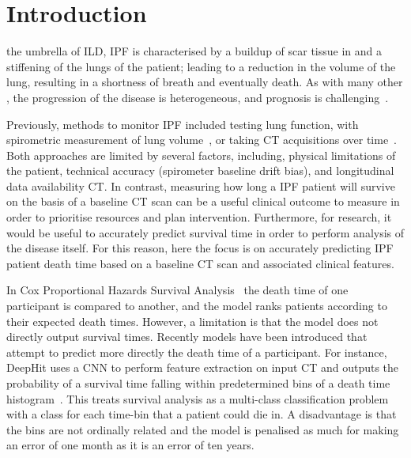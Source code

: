 
\section{Introduction} \label{sec:introduction}
     the umbrella of \gls{ILD}, \gls{IPF} is  characterised by a buildup of scar tissue in and a stiffening of the lungs of the patient; leading to a reduction in the volume of the lung, resulting in a shortness of breath and eventually death. As with many other , the progression of the disease is heterogeneous, and prognosis is challenging~\cite{King2011IdiopathicFibrosis}.
    
    Previously, methods to monitor \gls{IPF} included testing lung function, with spirometric measurement of lung volume~\cite{Watters1986AFibrosis}, or taking \gls{CT} acquisitions over time~\cite{Lynch2018DiagnosticPaper}. Both approaches are limited by several factors, including, physical limitations of the patient, technical accuracy (spirometer baseline drift bias), and  longitudinal data availability \gls{CT}. In contrast, measuring how long a \gls{IPF} patient will survive on the basis of a baseline \gls{CT} scan can be a useful clinical outcome to measure in order to prioritise resources and plan intervention. Furthermore, for research, it would be useful to accurately predict survival time in order to perform analysis of the disease itself. For this reason, here the focus is on accurately predicting \gls{IPF} patient death time based on a baseline \gls{CT} scan and associated clinical features.

    In Cox Proportional Hazards Survival Analysis~\cite{Cox1972RegressionLife-Tables} the death time of one participant is compared to another, and the model ranks patients according to their expected death times. However, a limitation is that the model does not directly output survival times. Recently models have been introduced that attempt to predict more directly the death time of a participant. For instance, DeepHit uses a \gls{CNN} to perform feature extraction on input \gls{CT} and outputs the probability of a survival time falling within predetermined bins of a death time histogram~\cite{Lee2018DeepHit:Risks}. This treats survival analysis as a multi-class classification problem with a class for each time-bin that a patient could die in. A disadvantage is that the bins are not ordinally related and the model is penalised as much for making an error of one month as it is an error of ten years.

